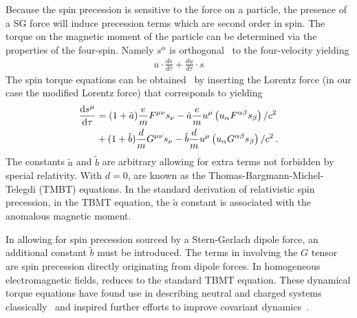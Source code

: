 Because the spin precession is sensitive to the force on a particle, the presence of a SG force will induce precession terms which are second order in spin. The torque on the magnetic moment of the particle can be determined via the properties of the four-spin. Namely $s^{\alpha}$ is orthogonal~\citep{schwinger1974spin} to the four-velocity yielding
\begin{gather}
    \label{bpot:4}
    u\cdot\frac{ds}{d\tau}+\frac{du}{d\tau}\cdot s
\end{gather}
The spin torque equations can be obtained~\citep{Bargmann:1959gz} by inserting the Lorentz force (in our case the modified Lorentz force) that corresponds to  yielding
\begin{alignat}{1}
  \notag\frac{\mathrm{d}s^{\mu}}{\mathrm{d}\tau}&=(1+\tilde{a})\frac{e}{m}F^{\mu\nu}s_{\nu}-\tilde{a}\frac{e}{m}u^{\mu}\left(u_{\alpha}F^{\alpha\beta}s_{\beta}\right)/c^{2}\\
  \label{LSG03}&+(1+\tilde{b})\frac{d}{m}G^{\mu\nu}s_{\nu}-\tilde{b}\frac{d}{m}u^{\mu}\left(u_{\alpha}G^{\alpha\beta}s_{\beta}\right)/c^{2}\,.
\end{alignat}
The constants $\tilde{a}$ and $\tilde{b}$ are arbitrary allowing for extra terms not forbidden by special relativity. With $d=0$,  are known as the Thomas-Bargmann-Michel-Telegdi (TMBT) equations. In the standard derivation of relativistic spin precession, in the TBMT equation, the $\tilde{a}$ constant is associated with the anomalous magnetic moment.

In allowing for spin precession sourced by a Stern-Gerlach dipole force, an additional constant $\tilde{b}$ must be introduced. The terms in  involving the $G$ tensor are spin precession directly originating from dipole forces. In homogeneous electromagnetic fields,  reduces to the standard TBMT equation. These dynamical torque equations have found use in describing neutral and charged systems classically~\citep{Formanek:2021mcp,Formanek:2019cga} and inspired further efforts to improve covariant dynamics~\citep{Formanek:2020ojr}.